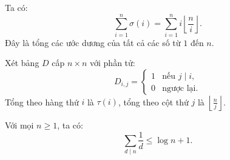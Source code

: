 \documentclass[../imo-training-open-book.tex]{subfiles}
\begin{document}
\begin{theorem*}
    \label{theorem:sum-of-divisors-table}
    Ta có:
    \[
        \sum_{i=1}^{n} \sigma(i) = \sum_{i=1}^{n} i \left\lfloor \frac{n}{i} \right\rfloor.
    \]
    Đây là tổng các ước dương của tất cả các số từ \( 1 \) đến \( n \).
\end{theorem*}

\vspace{1em}

\begin{theorem*}
    \label{theorem:divisor-matrix}
    Xét bảng \( D \) cấp \( n \times n \) với phần tử:
    \[
        D_{i,j} = 
        \begin{cases}
            1 & \text{nếu } j \mid i, \\
            0 & \text{ngược lại}.
        \end{cases}
    \]
    Tổng theo hàng thứ \( i \) là \( \tau(i) \), tổng theo cột thứ \( j \) là \( \left\lfloor \frac{n}{j} \right\rfloor \).
\end{theorem*}

\vspace{1em}

\begin{theorem*}
    \label{theorem:sum-of-divisors-harmonic}
    Với mọi \( n \ge 1 \), ta có:
    \[
        \sum_{d \mid n} \frac{1}{d} \le \log n + 1.
    \]
\end{theorem*}
\end{document}
